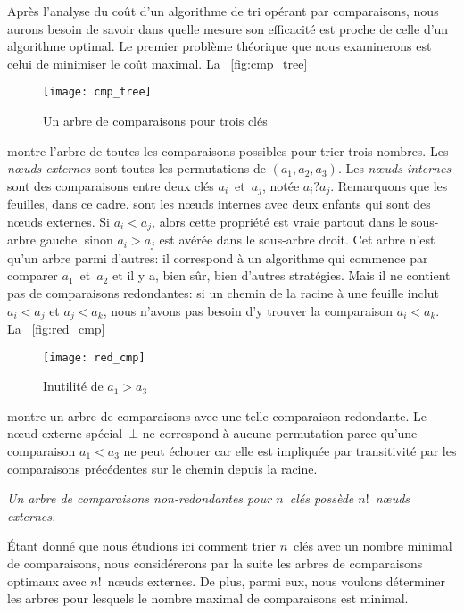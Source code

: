 Après l'analyse du coût d'un algorithme de tri opérant par
comparaisons, nous aurons besoin de savoir dans quelle mesure son
efficacité est proche de celle d'un algorithme
optimal. Le premier problème théorique que
nous examinerons est celui de minimiser le coût maximal. La
\fig~\vref{fig:cmp_tree}
\begin{figure}
\centering
\texttt{[image: cmp\_tree]}
\caption{Un arbre de comparaisons pour trois clés}
\label{fig:cmp_tree}
\end{figure}
montre l'arbre de toutes les comparaisons possibles
 pour trier trois
nombres. Les \emph{n{\oe}uds externes}
\label{def:external_node} sont toutes les
permutations de \((a_1,a_2,a_3)\). Les
\emph{n{\oe}uds internes} sont
des comparaisons entre deux clés \(a_i\)~et~\(a_j\), notée
\(a_i?a_j\). Remarquons que les feuilles, dans ce cadre, sont les
n{\oe}uds internes avec deux enfants qui sont des n{\oe}uds externes.
Si \({a_i < a_j}\), alors cette propriété est vraie partout dans le
sous-arbre gauche, sinon \({a_i > a_j}\) est avérée dans le sous-arbre
droit. Cet arbre n'est qu'un arbre parmi d'autres: il correspond à un
algorithme qui commence par comparer \(a_1\)~et~\(a_2\) et il y a,
bien sûr, bien d'autres stratégies. Mais il ne contient pas de
comparaisons redondantes: si un chemin de la racine à une feuille
inclut \({a_i < a_j}\) et \({a_j < a_k}\), nous n'avons pas besoin d'y
trouver la comparaison \({a_i < a_k}\). La \fig~\vref{fig:red_cmp}
\begin{figure}
\centering
\texttt{[image: red\_cmp]}
\caption{Inutilité de \(a_1 > a_3\)}
\label{fig:red_cmp}
\end{figure}
montre un arbre de comparaisons avec une telle comparaison
redondante. Le n{\oe}ud externe spécial~\(\bot\) ne correspond à
aucune permutation parce qu'une comparaison \({a_1 < a_3}\) ne peut
échouer car elle est impliquée par transitivité par les comparaisons
précédentes sur le chemin depuis la racine.
\begin{center}
  \emph{Un arbre de comparaisons non-redondantes pour \(n\)~clés
    possède \(n!\)~n{\oe}uds externes.}
\end{center}
Étant donné que nous étudions ici comment trier \(n\)~clés avec un
nombre minimal de comparaisons, nous considérerons par la suite les
arbres de comparaisons optimaux avec \(n!\)~n{\oe}uds externes. De
plus, parmi eux, nous voulons déterminer les arbres pour lesquels le
nombre maximal de comparaisons est minimal.

